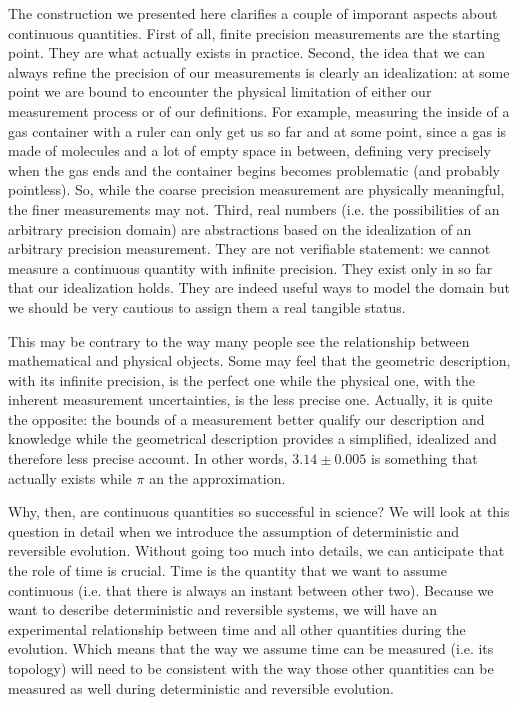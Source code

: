 \documentclass[11pt,letterpaper,fleqn]{memoir} %
\begin{document}
The construction we presented here clarifies a couple of imporant aspects about continuous quantities. First of all, finite precision measurements are the starting point. They are what actually exists in practice. Second, the idea that we can always refine the precision of our measurements is clearly an idealization: at some point we are bound to encounter the physical limitation of either our measurement process or of our definitions. For example, measuring the inside of a gas container with a ruler can only get us so far and at some point, since a gas is made of molecules and a lot of empty space in between, defining very precisely when the gas ends and the container begins becomes problematic (and probably pointless). So, while the coarse precision measurement are physically meaningful, the finer measurements may not. Third, real numbers (i.e. the possibilities of an arbitrary precision domain) are abstractions based on the idealization of an arbitrary precision measurement. They are not verifiable statement: we cannot measure a continuous quantity with infinite precision. They exist only in so far that our idealization holds. They are indeed useful ways to model the domain but we should be very cautious to assign them a real tangible status.

This may be contrary to the way many people see the relationship between mathematical and physical objects. Some may feel that the geometric description, with its infinite precision, is the perfect one while the physical one, with the inherent measurement uncertainties, is the less precise one. Actually, it is quite the opposite: the bounds of a measurement better qualify our description and knowledge while the geometrical description provides a simplified, idealized and therefore less precise account. In other words, $3.14 \pm 0.005$ is something that actually exists while $\pi$ an the approximation.

Why, then, are continuous quantities so successful in science? We will look at this question in detail when we introduce the assumption of deterministic and reversible evolution. Without going too much into details, we can anticipate that the role of time is crucial. Time is the quantity that we want to assume continuous (i.e. that there is always an instant between other two). Because we want to describe deterministic and reversible systems, we will have an experimental relationship between time and all other quantities during the evolution. Which means that the way we assume time can be measured (i.e. its topology) will need to be consistent with the way those other quantities can be measured as well during deterministic and reversible evolution.
\end{document}
